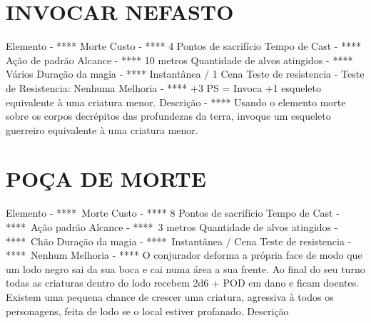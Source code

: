 \documentclass{article}%
\begin{document}
\section{INVOCAR NEFASTO}%
\label{sec:INVOCARNEFASTO}%
Elemento {-} **** Morte\newline%
Custo {-} **** 4 Pontos de sacrifício\newline%
Tempo de Cast {-} **** Ação de padrão\newline%
Alcance {-} **** 10 metros\newline%
Quantidade de alvos atingidos {-} **** Vários\newline%
Duração da magia {-} **** Instantânea / 1 Cena\newline%
Teste de resistencia {-} Teste de Resistencia: Nenhuma\newline%
Melhoria {-} **** +3 PS = Invoca +1 esqueleto equivalente à uma criatura menor.\newline%
Descrição {-} **** Usando o elemento morte sobre os corpos decrépitos das profundezas da terra, invoque um esqueleto guerreiro equivalente à uma criatura menor.\newline%

%
\section{POÇA DE MORTE}%
\label{sec:POADEMORTE}%
Elemento {-} ****~Morte\newline%
Custo {-} **** 8 Pontos de sacrifício\newline%
Tempo de Cast {-} ****~Ação padrão\newline%
Alcance {-} ****~3 metros\newline%
Quantidade de alvos atingidos {-} ****~Chão\newline%
Duração da magia {-} ****~Instantânea / Cena\newline%
Teste de resistencia {-} ****~Nenhum\newline%
Melhoria {-} **** O conjurador deforma a própria face de modo que um lodo negro sai da sua boca e cai numa área a sua frente. Ao final do seu turno todas as criaturas dentro do lodo recebem 2d6 + POD em dano e ficam doentes. Existem uma pequena chance de crescer uma criatura, agressiva à todos os personagens, feita de lodo se o local estiver profanado.\newline%
Descrição \newline%

%
\end{document}
